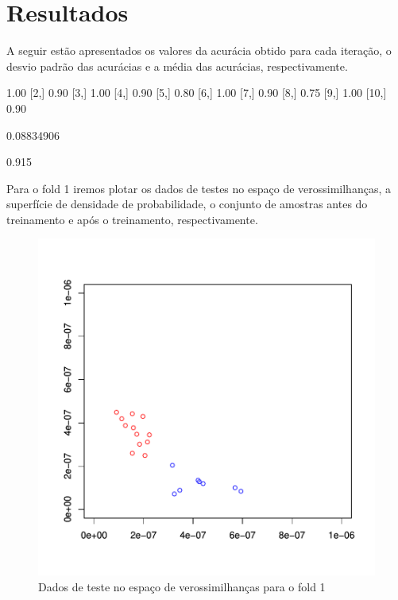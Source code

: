 \documentclass[12pt]{article}
\begin{document}
\section{Resultados}

  \par A seguir estão apresentados os valores da acurácia obtido para cada iteração, o desvio padrão das acurácias e a média das acurácias, respectivamente. 
\begin{Schunk}
\begin{Soutput}
      [,1]
 [1,] 1.00
 [2,] 0.90
 [3,] 1.00
 [4,] 0.90
 [5,] 0.80
 [6,] 1.00
 [7,] 0.90
 [8,] 0.75
 [9,] 1.00
[10,] 0.90
\end{Soutput}
\begin{Soutput}
[1] 0.08834906
\end{Soutput}
\begin{Soutput}
[1] 0.915
\end{Soutput}
\end{Schunk}

  \par Para o fold 1 iremos plotar os dados de testes no espaço de verossimilhanças, a superfície de densidade de probabilidade, o conjunto de amostras antes do treinamento e após o treinamento, respectivamente.

\begin{figure}[h]
\centering
\includegraphics{KDE-004}
\caption{Dados de teste no espaço de verossimilhanças para o fold 1}
\label{8}
\end{figure}
\end{document}
